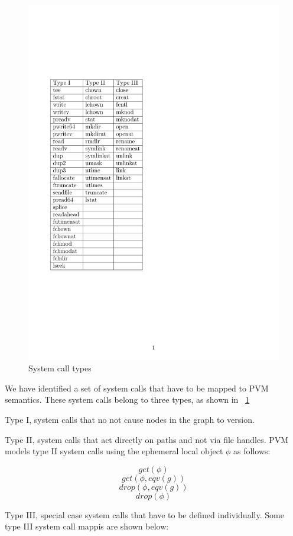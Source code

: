 \documentclass[withindex,glossary]{cam-thesis}
\begin{document}
\begin{figure}[t!]
  \centering
    \includegraphics[width=1.0\columnwidth]{SysCalls}
  \caption{System call types}
  \label{fig:syscalltypes}
\end{figure}

We have identified a set of system calls that have to be mapped to PVM semantics.
These system calls belong to three types, as shown in ~\ref{fig:syscalltypes}

Type I, system calls that no not cause nodes in the graph to version.

Type II, system calls that act directly on paths and not via file handles.
PVM models type II system calls using the ephemeral local object $\phi$ as follows:

$$get(\phi)$$
$$get(\phi, eqv(g))$$
$$drop(\phi, eqv(g))$$
$$drop(\phi)$$

Type III, special case system calls that have to be defined individually.
Some type III system call mappis are shown below:
\end{document}
